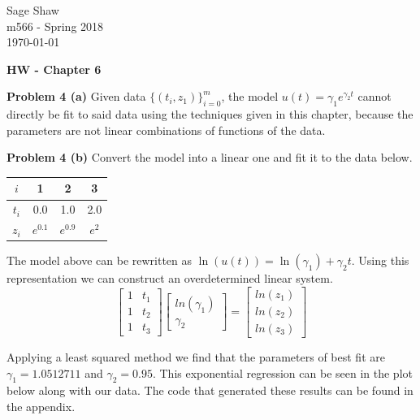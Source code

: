 \documentclass[12pt]{article}
\newcommand{\problem}[1]{\hspace{-4 ex} \large \textbf{Problem #1} }
\begin{document}
	\thispagestyle{empty}
	
	\begin{flushright}
		Sage Shaw \\
		m566 - Spring 2018 \\
		\today
	\end{flushright}
	
{\large \textbf{HW - Chapter 6}}\bigbreak

\problem{4 (a)} Given data $\{(t_i,z_1)\}_{i=0}^m$, the model $u(t) = \gamma_1 e^{\gamma_2 t}$ cannot directly be fit to said data using the techniques given in this chapter, because the parameters are not linear combinations of functions of the data.

\bigbreak
\problem{4 (b)} Convert the model into a linear one and fit it to the data below.

\begin{center}
	\begin{tabular}{|c|c|c|c|}
		\hline
		$i$&1&2&3\\ \hline
		$t_i$&0.0&1.0&2.0\\ \hline
		$z_i$&$e^{0.1}$&$e^{0.9}$&$e^{2}$\\ \hline
	\end{tabular}
\end{center}

The model above can be rewritten as $\ln(u(t)) = \ln(\gamma_1) + \gamma_2 t$. Using this representation we can construct an overdetermined linear system.
$$
\begin{bmatrix}
1 & t_1\\
1 & t_2\\
1 & t_3
\end{bmatrix}
\begin{bmatrix}
ln(\gamma_1)\\
\gamma_2
\end{bmatrix}
=
\begin{bmatrix}
ln(z_1)\\
ln(z_2)\\
ln(z_3)
\end{bmatrix}
$$

Applying a least squared method we find that the parameters of best fit are $\gamma_1 = 1.0512711$ and $\gamma_2 = 0.95$. This exponential regression can be seen in the plot below along with our data. The code that generated these results can be found in the appendix.
\end{document}
